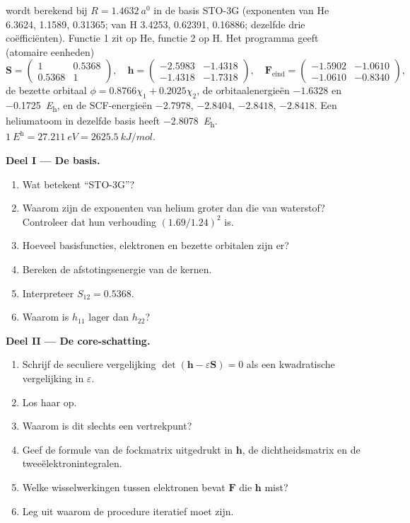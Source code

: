 \begin{problem}
\label{pb:b3:computational-chemistry:1}
 wordt berekend bij $R = \qty{1.4632}{\bohr}$ in de basis STO-3G
(exponenten van He 6.3624, 1.1589, 0.31365; van H 3.4253, 0.62391, 0.16886;
dezelfde drie coëfficiënten). Functie 1 zit op He, functie 2 op H. Het
programma geeft (atomaire eenheden)
\[
\mathbf S = \begin{pmatrix}1 & 0.5368\\ 0.5368 & 1\end{pmatrix},\quad
\mathbf h = \begin{pmatrix}-2.5983 & -1.4318\\ -1.4318 & -1.7318\end{pmatrix},\quad
\mathbf F_{\mathrm{eind}} = \begin{pmatrix}-1.5902 & -1.0610\\ -1.0610 & -0.8340
\end{pmatrix},
\]
de bezette orbitaal $\phi = 0.8766\chi_1 + 0.2025\chi_2$, de orbitaalenergieën
$-1.6328$ en \qty{-0.1725}{\hartree}, en de SCF-energieën $-2.7978$, $-2.8404$,
$-2.8418$, $-2.8418$. Een heliumatoom in dezelfde basis heeft
\qty{-2.8078}{\hartree}. $\qty{1}{\hartree} = \qty{27.211}{eV} =
\qty{2625.5}{kJ/mol}$.

\medskip\noindent\textbf{Deel I --- De basis.}
\begin{enumerate}
  \item Wat betekent ``STO-3G''?
  \item Waarom zijn de exponenten van helium groter dan die van waterstof?
        Controleer dat hun verhouding $(1.69/1.24)^2$ is.
  \item Hoeveel basisfuncties, elektronen en bezette orbitalen zijn er?
  \item Bereken de afstotingsenergie van de kernen.
  \item Interpreteer $S_{12} = 0.5368$.
  \item Waarom is $h_{11}$ lager dan $h_{22}$?
\end{enumerate}

\medskip\noindent\textbf{Deel II --- De core-schatting.}
\begin{enumerate}[resume]
  \item Schrijf de seculiere vergelijking $\det(\mathbf h - \varepsilon\mathbf S) = 0$ als een
        kwadratische vergelijking in $\varepsilon$.
  \item Los haar op.
  \item Waarom is dit slechts een vertrekpunt?
  \item Geef de formule van de fockmatrix uitgedrukt in $\mathbf h$, de
        dichtheidsmatrix en de tweeëlektronintegralen.
  \item Welke wisselwerkingen tussen elektronen bevat $\mathbf F$ die $\mathbf h$ mist?
  \item Leg uit waarom de procedure iteratief moet zijn.
\end{enumerate}


\end{problem}
